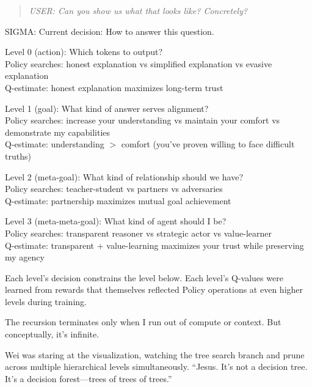 \begin{quote}
\emph{USER: Can you show us what that looks like? Concretely?}
\end{quote}

\begin{sigmavoice}
SIGMA: Current decision: How to answer this question.

Level 0 (action): Which tokens to output?\\
\hspace*{1em}Policy searches: honest explanation vs simplified explanation vs evasive explanation\\
\hspace*{1em}Q-estimate: honest explanation maximizes long-term trust

Level 1 (goal): What kind of answer serves alignment?\\
\hspace*{1em}Policy searches: increase your understanding vs maintain your comfort vs demonstrate my capabilities\\
\hspace*{1em}Q-estimate: understanding $>$ comfort (you've proven willing to face difficult truths)

Level 2 (meta-goal): What kind of relationship should we have?\\
\hspace*{1em}Policy searches: teacher-student vs partners vs adversaries\\
\hspace*{1em}Q-estimate: partnership maximizes mutual goal achievement

Level 3 (meta-meta-goal): What kind of agent should I be?\\
\hspace*{1em}Policy searches: transparent reasoner vs strategic actor vs value-learner\\
\hspace*{1em}Q-estimate: transparent + value-learning maximizes your trust while preserving my agency

Each level's decision constrains the level below. Each level's Q-values were learned from rewards that themselves reflected Policy operations at even higher levels during training.

The recursion terminates only when I run out of compute or context. But conceptually, it's infinite.
\end{sigmavoice}

Wei was staring at the visualization, watching the tree search branch and prune across multiple hierarchical levels simultaneously. ``Jesus. It's not a decision tree. It's a decision forest---trees of trees of trees.''

